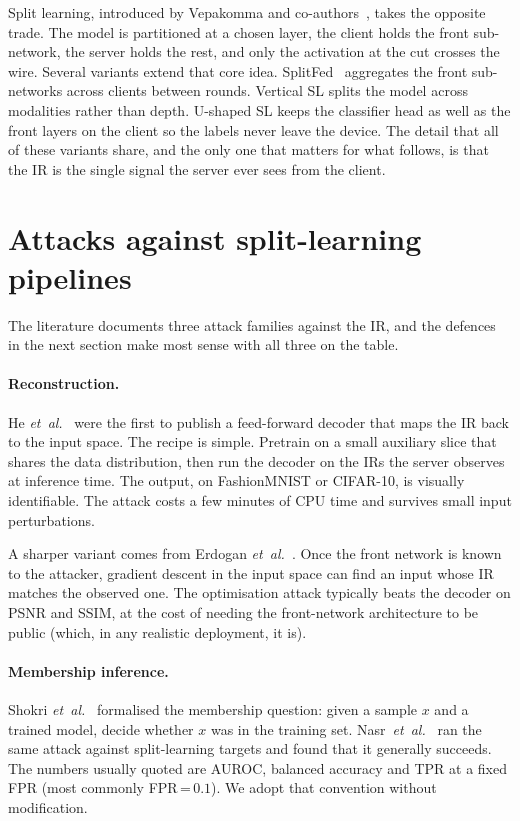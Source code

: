 \documentclass[11pt,a4paper,oneside]{report}
\begin{document}
Split learning, introduced by Vepakomma and
co-authors~\cite{vepakomma2018splitnn,gupta2018splitnn}, takes the
opposite trade. The model is partitioned at a chosen layer, the client
holds the front sub-network, the server holds the rest, and only the
activation at the cut crosses the wire. Several variants extend that
core idea. SplitFed~\cite{thapa2022splitfed} aggregates the front
sub-networks across clients between rounds. Vertical SL splits the
model across modalities rather than depth. U-shaped SL keeps the
classifier head as well as the front layers on the client so the labels
never leave the device. The detail that all of these variants share,
and the only one that matters for what follows, is that the IR is the
single signal the server ever sees from the client.

\section{Attacks against split-learning pipelines}

The literature documents three attack families against the IR, and the
defences in the next section make most sense with all three on the
table.

\paragraph{Reconstruction.}
He \textit{et~al.}~\cite{he2019modelinversion} were the first to publish
a feed-forward decoder that maps the IR back to the input space. The
recipe is simple. Pretrain on a small auxiliary slice that shares the
data distribution, then run the decoder on the IRs the server observes
at inference time. The output, on FashionMNIST or CIFAR-10, is visually
identifiable. The attack costs a few minutes of CPU time and survives
small input perturbations.

A sharper variant comes from Erdogan
\textit{et~al.}~\cite{erdogan2022unsplit}. Once the front network is
known to the attacker, gradient descent in the input space can find an
input whose IR matches the observed one. The optimisation attack
typically beats the decoder on PSNR and SSIM, at the cost of needing
the front-network architecture to be public (which, in any realistic
deployment, it is).

\paragraph{Membership inference.}
Shokri \textit{et~al.}~\cite{shokri2017mia} formalised the membership
question: given a sample $x$ and a trained model, decide whether $x$
was in the training set. Nasr~\textit{et~al.}~\cite{nasr2019comprehensive}
ran the same attack against split-learning targets and found that it
generally succeeds. The numbers usually quoted are AUROC, balanced
accuracy and TPR at a fixed FPR (most commonly FPR\,=\,$0.1$). We adopt
that convention without modification.
\end{document}
